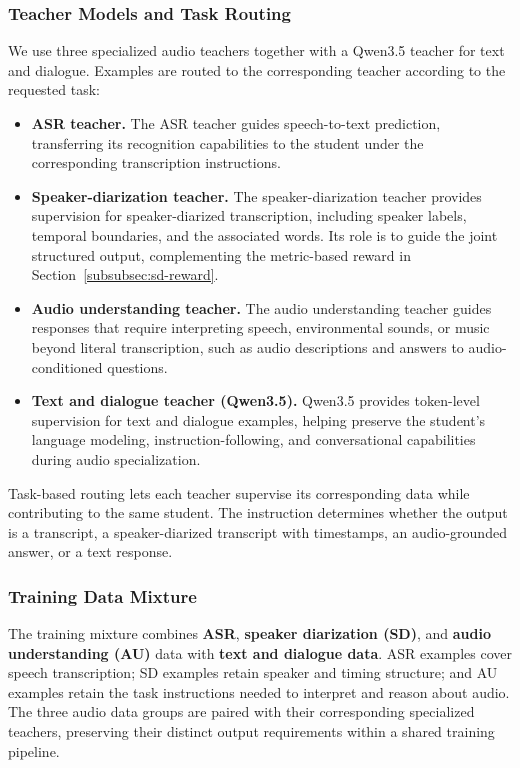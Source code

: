 \documentclass{article}
\begin{document}
\subsubsection{Teacher Models and Task Routing}
\label{subsubsec:opd-teachers}

We use three specialized audio teachers together with a Qwen3.5 teacher for text and dialogue. Examples are routed to the corresponding teacher according to the requested task:
\begin{itemize}[leftmargin=*,noitemsep]
    \item \textbf{ASR teacher.} The ASR teacher guides speech-to-text prediction, transferring its recognition capabilities to the student under the corresponding transcription instructions.
    \item \textbf{Speaker-diarization teacher.} The speaker-diarization teacher provides supervision for speaker-diarized transcription, including speaker labels, temporal boundaries, and the associated words. Its role is to guide the joint structured output, complementing the metric-based reward in Section~\ref{subsubsec:sd-reward}.
    \item \textbf{Audio understanding teacher.} The audio understanding teacher guides responses that require interpreting speech, environmental sounds, or music beyond literal transcription, such as audio descriptions and answers to audio-conditioned questions.
    \item \textbf{Text and dialogue teacher (Qwen3.5).} Qwen3.5 provides token-level supervision for text and dialogue examples, helping preserve the student's language modeling, instruction-following, and conversational capabilities during audio specialization.
\end{itemize}
Task-based routing lets each teacher supervise its corresponding data while contributing to the same student. The instruction determines whether the output is a transcript, a speaker-diarized transcript with timestamps, an audio-grounded answer, or a text response.

\subsubsection{Training Data Mixture}
\label{subsubsec:opd-data}

The training mixture combines \textbf{ASR}, \textbf{speaker diarization (SD)}, and \textbf{audio understanding (AU)} data with \textbf{text and dialogue data}. ASR examples cover speech transcription; SD examples retain speaker and timing structure; and AU examples retain the task instructions needed to interpret and reason about audio. The three audio data groups are paired with their corresponding specialized teachers, preserving their distinct output requirements within a shared training pipeline.
\end{document}
